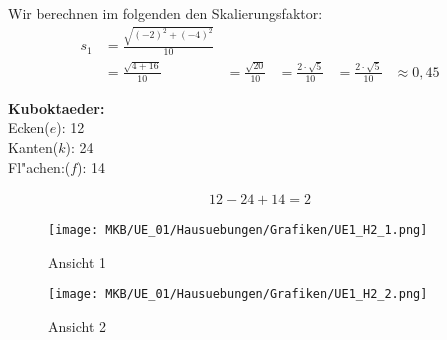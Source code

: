 \begin{Loesung}
\begin{Teilloesungen}

\item Wir berechnen im folgenden den Skalierungsfaktor:
\begin{align*}
s_1 &= \frac{\sqrt{(-2)^{2}+(-4)^{2}}}{10}\\
&= \frac{\sqrt{4+16}}{10}
&= \frac{\sqrt{20}}{10}
&= \frac{2 \cdot \sqrt{5}}{10}
&= \frac{2 \cdot \sqrt{5}}{10}
&\approx 0,45
\end{align*}

\item \textbf{Kuboktaeder:} \\
Ecken($e$): 12\\
Kanten($k$): 24\\
Fl"achen:($f$): 14\\

\item \begin{align*}
12 - 24 + 14 = 2
\end{align*}


\item \begin{figure}[H]
	\centering
	\texttt{[image: MKB/UE\_01/Hausuebungen/Grafiken/UE1\_H2\_1.png]}
	\caption{Ansicht 1}
	\label{fig:H2_1}
\end{figure}

\begin{figure}[H]
	\centering
	\texttt{[image: MKB/UE\_01/Hausuebungen/Grafiken/UE1\_H2\_2.png]}
	\caption{Ansicht 2}
	\label{fig:H2_2}
\end{figure}
\label{Dimetrie}
\\[-5ex]
{\def\largeur{14}
\def\hauteur{8}
\def\origine{(7,6)}
\def\alpha{221.41}
\def\beta{352.819}
\def\Sfx{0.5}
\def\Sfy{1}
\def\Sfz{1}
\begin{center}
\end{center}}
\end{Teilloesungen}
\end{Loesung}
